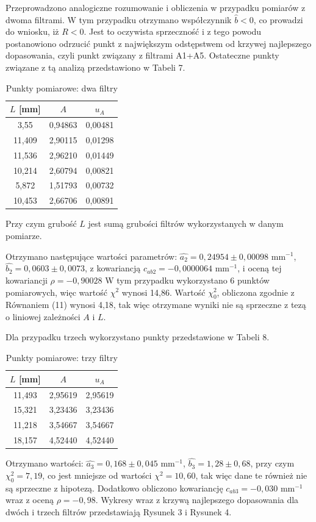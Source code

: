 \documentclass[10pt,a4paper]{article}
\begin{document}
 Przeprowadzono analogiczne rozumowanie i obliczenia w przypadku pomiarów z dwoma filtrami. W tym przypadku otrzymano współczynnik $\hat{b}<0$, co prowadzi do wniosku, iż $R<0$. Jest to oczywista sprzeczność i z tego powodu postanowiono odrzucić punkt z największym odstępstwem od krzywej najlepszego dopasowania, czyli punkt związany z filtrami A1+A5. Ostateczne punkty związane z tą analizą przedstawiono w Tabeli 7.
 
\begin{table}[h!]
\centering
\caption{Punkty pomiarowe: dwa filtry}
\label{my-label}
\begin{tabular}{|c|c|c|}
\hline
$L$ [mm] & $A$     & $u_{A}$ \\ \hline
3,55     & 0,94863 & 0,00481 \\ \hline
11,409   & 2,90115 & 0,01298 \\ \hline
11,536   & 2,96210 & 0,01449 \\ \hline
10,214   & 2,60794 & 0,00821 \\ \hline
5,872    & 1,51793 & 0,00732 \\ \hline
10,453   & 2,66706 & 0,00891 \\ \hline
\end{tabular}
\end{table} 
 Przy czym grubość $L$ jest sumą grubości filtrów wykorzystanych w danym pomiarze. 
 
 Otrzymano następujące wartości parametrów: $\hat{a_{2}}=0,24954\pm0,00098$ mm$^{-1}$, $\hat{b_{2}}=0,0603\pm0,0073$, z kowariancją $c_{ab2}=-0,0000064$ mm$^{-1}$, i oceną tej kowariancji $\rho=-0,90028$ 
 W tym przypadku wykorzystano 6 punktów pomiarowych, więc wartość $\chi^2$ wynosi 14,86. Wartość $\chi_{0}^2$, obliczona zgodnie z Równaniem (11) wynosi 4,18, tak więc otrzymane wyniki nie są sprzeczne z tezą o liniowej zależności $A$ i $L$. 
 
 Dla przypadku trzech wykorzystano punkty przedstawione w Tabeli 8. 
 
 \begin{table}[h!]
\centering
\caption{Punkty pomiarowe: trzy filtry}
\label{t8}
\begin{tabular}{|c|c|c|}
\hline
$L$ [mm] & $A$     & $u_{A}$ \\ \hline
11,493   & 2,95619 & 2,95619 \\ \hline
15,321   & 3,23436 & 3,23436 \\ \hline
11,218   & 3,54667 & 3,54667 \\ \hline
18,157   & 4,52440 & 4,52440 \\ \hline
\end{tabular}
\end{table}
Otrzymano wartości: $\hat{a_{3}}=0,168\pm0,045$ mm$^{-1}$, $\hat{b_{3}}=1,28\pm0,68$, przy czym $\chi_{0}^2=7,19$, co jest mniejsze od wartości $\chi^2=10,60$, tak więc dane te również nie są sprzeczne z hipotezą. Dodatkowo obliczono kowariancję $c_{ab3}=-0,030$ mm$^{-1}$ wraz z oceną $\rho=-0,98$. Wykresy wraz z krzywą najlepszego dopasowania dla dwóch i trzech filtrów przedstawiają Rysunek 3 i Rysunek 4.
\end{document}
